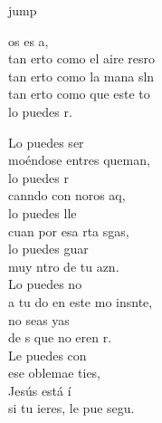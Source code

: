 \begin{cancion}jump\\
	\begin{chorus}%
		os es a,\\
		tan erto como el aire  resro \\
		tan erto como la mana sln \\
		tan erto como que este to \\
		lo puedes r.\jump\\
	\end{chorus}%
	Lo puedes ser\\
	moéndose entres queman,\\
	lo puedes r\\
	canndo con noros aq,\\
	lo puedes lle \\
	cuan por esa rta sgas,\\
	lo puedes guar \\
	muy ntro de tu azn.\\
	\jump
	Lo puedes no \\
	a tu do en este mo insnte,\\
	no seas yas\\
	de s que no eren r.\\
	Le puedes con \\
	ese oblemae ties,\\
	Jesús está í\\
	si tu ieres, le pue segu.\\
	\jump
\end{cancion}%
